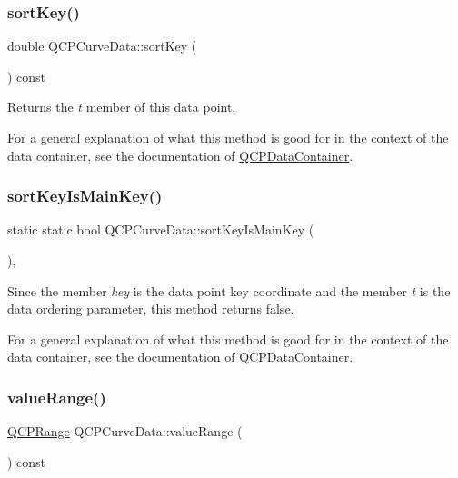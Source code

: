 \subsubsection{\texorpdfstring{sortKey()}{sortKey()}}
{\footnotesize\ttfamily double Q\+C\+P\+Curve\+Data\+::sort\+Key (\begin{DoxyParamCaption}{ }\end{DoxyParamCaption}) const\hspace{0.3cm}{\ttfamily [inline]}}

Returns the {\itshape t} member of this data point.

For a general explanation of what this method is good for in the context of the data container, see the documentation of \mbox{\hyperlink{class_q_c_p_data_container}{Q\+C\+P\+Data\+Container}}. \mbox{\label{class_q_c_p_curve_data_a1b78f228e31ca40a1e69add44537918c}} 
\subsubsection{\texorpdfstring{sortKeyIsMainKey()}{sortKeyIsMainKey()}}
{\footnotesize\ttfamily static static bool Q\+C\+P\+Curve\+Data\+::sort\+Key\+Is\+Main\+Key (\begin{DoxyParamCaption}{ }\end{DoxyParamCaption})\hspace{0.3cm}{\ttfamily [inline]}, {\ttfamily [static]}}

Since the member {\itshape key} is the data point key coordinate and the member {\itshape t} is the data ordering parameter, this method returns false.

For a general explanation of what this method is good for in the context of the data container, see the documentation of \mbox{\hyperlink{class_q_c_p_data_container}{Q\+C\+P\+Data\+Container}}. \mbox{\label{class_q_c_p_curve_data_acf15deffd18d400651f8384a95dad9f8}} 
\subsubsection{\texorpdfstring{valueRange()}{valueRange()}}
{\footnotesize\ttfamily \mbox{\hyperlink{class_q_c_p_range}{Q\+C\+P\+Range}} Q\+C\+P\+Curve\+Data\+::value\+Range (\begin{DoxyParamCaption}{ }\end{DoxyParamCaption}) const\hspace{0.3cm}{\ttfamily [inline]}}

